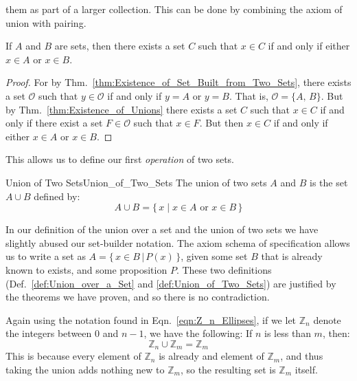         them as part of a larger collection. This can be done by combining the
        axiom of union with
        pairing.
        \begin{theorem}
            \label{thm:Union_of_Two_Sets_Exists}%
            If $A$ and $B$ are sets, then there exists a set $C$ such that
            $x\in{C}$ if and only if either $x\in{A}$ or $x\in{B}$.
        \end{theorem}
        \begin{proof}
            For by Thm.~\ref{thm:Existence_of_Set_Built_from_Two_Sets},
            there exists a set $\mathcal{O}$ such that $y\in\mathcal{O}$ if and
            only if $y=A$ or $y=B$. That is, $\mathcal{O}=\{A,\,B\}$.
            But by Thm.~\ref{thm:Existence_of_Unions} there exists a set
            $C$ such that $x\in{C}$ if and only if there exist a set
            $F\in\mathcal{O}$ such that $x\in{F}$. But then $x\in{C}$ if and
            only if either $x\in{A}$ or $x\in{B}$.
        \end{proof}
        This allows us to define our first \textit{operation} of two sets.
        \begin{fdefinition}{Union of Two Sets}{Union_of_Two_Sets}
            The \gls{union of two sets} $A$ and $B$ is the set $A\cup{B}$
            defined by:
            \begin{equation*}
                A\cup{B}=\big\{\,x\;|\;x\in{A}\textrm{ or }x\in{B}\,\big\}
            \end{equation*}
        \end{fdefinition}
        In our definition of the union over a set and the union of two sets
        we have slightly abused our set-builder notation. The axiom schema
        of specification allows us to write a set as
        $A=\{\,x\in{B}\,|\,P(x)\,\}$, given some set $B$ that is already known
        to exists, and some proposition $P$. These two definitions
        (Def.~\ref{def:Union_over_a_Set} and \ref{def:Union_of_Two_Sets})
        are justified by the theorems we have proven, and so there is no
        contradiction.
        \begin{example}
            Again using the notation found in Eqn.~\ref{eqn:Z_n_Ellipses}, if we
            let $\mathbb{Z}_{n}$ denote the integers between $0$ and $n-1$, we
            have the following: If $n$ is less than $m$, then:
            \begin{equation}
                \mathbb{Z}_{n}\cup\mathbb{Z}_{m}=\mathbb{Z}_{m}
            \end{equation}
            This is because every element of $\mathbb{Z}_{n}$ is already
            and element of $\mathbb{Z}_{m}$, and thus taking the union adds
            nothing new to $\mathbb{Z}_{m}$, so the resulting set is
            $\mathbb{Z}_{m}$ itself.
        \end{example}
